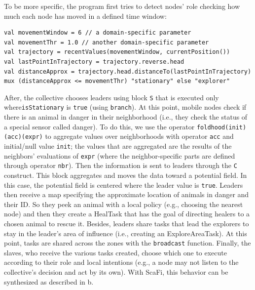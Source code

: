 \documentclass[jsan,article,accept,moreauthors,pdftex]{Definitions/mdpi}
\begin{document}
\begin{paracol}{2}
To be more specific, 
 the program first tries to detect nodes' role 
 checking how much each node has moved in a defined time window:
\begin{lstlisting}
val movementWindow = 6 // a domain-specific parameter
val movementThr = 1.0 // another domain-specific parameter
val trajectory = recentValues(movementWindow, currentPosition())
val lastPointInTrajectory = trajectory.reverse.head
val distanceApprox = trajectory.head.distanceTo(lastPointInTrajectory)
mux (distanceApprox <= movementThr) "stationary" else "explorer"
\end{lstlisting}
%

After, the collective chooses leaders using block \lstinline!S! that is executed
 only where\linebreak  \lstinline!isStationary! is \lstinline!true! (using \lstinline!branch!).
%
At this point, mobile nodes check if there is an animal 
 in danger in their neighborhood (i.e., they check the status of a 
 special sensor called danger). 
% 
To do this, we use the operator \lstinline|foldhood(init)(acc)(expr)|
 to aggregate values over neighborhoods with operator \lstinline|acc| and initial/null value \lstinline|init|; the values that are aggregated are the results of the neighbors' evaluations of \lstinline|expr| (where the neighbor-specific parts are defined through operator \lstinline|nbr|).
%
Then the information is sent to leaders through the \lstinline|C| construct.
 This block aggregates and moves the data toward a potential field. 
 In this case, the potential field is centered where the leader value is \lstinline!true!.
%
Leaders then receive a map specifying 
 the approximate location of animals in danger and their ID.
 So they peek an animal with a local policy 
 (e.g., choosing the nearest node) and then they create a {HealTask} 
 that has the goal of directing healers to a chosen animal to 
 rescue it. Besides, leaders share tasks that lead the explorers 
 to stay in the leader's area of influence (i.e., creating an {ExploreAreaTask}).
%
At this point, tasks are shared across 
 the zones with the \lstinline|broadcast| function.
%
Finally, the slaves, who receive the various tasks created,
 choose which one to execute according to their role and 
 local intentions (e.g., a node may not listen to 
 the collective's decision and act by its own).
%
With ScaFi, this behavior can be synthesized as described in b.
%


\clearpage
\end{paracol}
\end{document}
